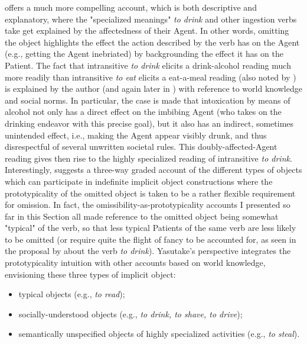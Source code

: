 \textcite[141]{Naess2007} offers a much more compelling account, which is both descriptive and explanatory, where the "specialized meanings" \textit{to drink} and other ingestion verbs take get explained by the affectedness of their Agent. In other words, omitting the object highlights the effect the action described by the verb has on the Agent (e.g., getting the Agent inebriated) by backgrounding the effect it has on the Patient. The fact that intransitive \textit{to drink} elicits a drink-alcohol reading much more readily than intransitive \textit{to eat} elicits a eat-a-meal reading (also noted by \textcite[14]{NewmanRice2006}) is explained by the author (and again later in \textcite[420]{Naess2011}) with reference to world knowledge and social norms. In particular, the case is made that intoxication by means of alcohol not only has a direct effect on the imbibing Agent (who takes on the drinking endeavor with this precise goal), but it also has an indirect, sometimes unintended effect, i.e., making the Agent appear visibly drunk, and thus disrespectful of several unwritten societal rules. This doubly-affected-Agent reading gives then rise to the highly specialized reading of intransitive \textit{to drink}.\\
Interestingly, \textcite[48-50]{Yasutake1987} suggests a three-way graded account of the different types of objects which can participate in indefinite implicit object constructions where the prototypicality of the omitted object is taken to be a rather flexible requirement for omission. In fact, the omissibility-as-prototypicality accounts I presented so far in this Section all made reference to the omitted object being somewhat "typical" of the verb, so that less typical Patients of the same verb are less likely to be omitted (or require quite the flight of fancy to be accounted for, as seen in the proposal by \textcite{HuddlestonEtAl2002} about the verb \textit{to drink}). Yasutake's perspective integrates the prototypicality intuition with other accounts based on world knowledge, envisioning these three types of implicit object:
\begin{itemize}
    \item typical objects (e.g., \textit{to read});
    \item socially-understood objects (e.g., \textit{to drink, to shave, to drive});
    \item semantically unspecified objects of highly specialized activities (e.g., \textit{to steal}).
\end{itemize}


